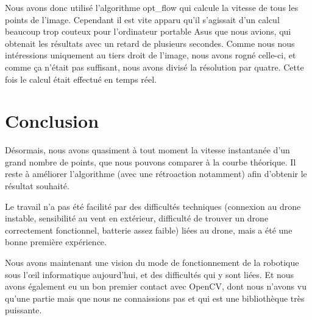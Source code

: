 \documentclass[titlepage,11pt,a4paper]{article}
\begin{document}
Nous avons donc utilisé l'algorithme opt\_flow qui calcule la vitesse de tous les points de l'image. Cependant il est vite apparu qu'il s'agissait d'un calcul beaucoup trop couteux pour l'ordinateur portable Asus que nous avions, qui obtenait les résultats avec un retard de plusieurs secondes. Comme nous nous intéressions uniquement au tiers droit de l'image, nous avons rogné celle-ci, et comme ça n'était pas suffisant, nous avons divisé la résolution par quatre. Cette fois le calcul était effectué en temps réel.

\newpage

\section*{Conclusion}
Désormais, nous avons quasiment à tout moment la vitesse instantanée d'un grand nombre de points, que nous pouvons comparer à la courbe théorique. Il reste à améliorer l'algorithme (avec une rétroaction notamment) afin d'obtenir le résultat souhaité.

Le travail n'a pas été facilité par des difficultés techniques (connexion au drone instable, sensibilité au vent en extérieur, difficulté de trouver un drone correctement fonctionnel, batterie assez faible) liées au drone, mais a été une bonne première expérience.

Nous avons maintenant une vision du mode de fonctionnement de la robotique sous l'œil informatique aujourd'hui, et des difficultés qui y sont liées. Et nous avons également eu un bon premier contact avec OpenCV, dont nous n'avons vu qu'une partie mais que nous ne connaissions pas et qui est une bibliothèque très puissante.
\end{document}
